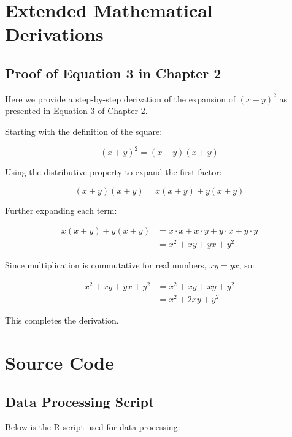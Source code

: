 \documentclass[
  letterpaper,
  oneside,
  openany]{MastersDoctoralThesis}
\begin{document}
\section{Extended Mathematical
Derivations}\label{sec-app-b-math-derivations}

\subsection{Proof of Equation 3 in Chapter 2}\label{sec-app-b-proof-eq3}

Here we provide a step-by-step derivation of the expansion of
\((x + y)^2\) as presented in \hyperref[eq-expand]{Equation 3} of
\hyperref[sec-ch2-adv-eq]{Chapter 2}.

Starting with the definition of the square:

\[
(x + y)^2 = (x + y)(x + y)
\]

Using the distributive property to expand the first factor:

\[
(x + y)(x + y) = x(x + y) + y(x + y)
\]

Further expanding each term:

\[
\begin{aligned}
x(x + y) + y(x + y) &= x \cdot x + x \cdot y + y \cdot x + y \cdot y \\
&= x^2 + xy + yx + y^2
\end{aligned}
\]

Since multiplication is commutative for real numbers, \(xy = yx\), so:

\[
\begin{aligned}
x^2 + xy + yx + y^2 &= x^2 + xy + xy + y^2 \\
&= x^2 + 2xy + y^2
\end{aligned}
\]

This completes the derivation.

\section{Source Code}\label{sec-app-b-source-code}

\subsection{Data Processing Script}\label{sec-app-b-data-proc-script}

Below is the R script used for data processing:
\end{document}
